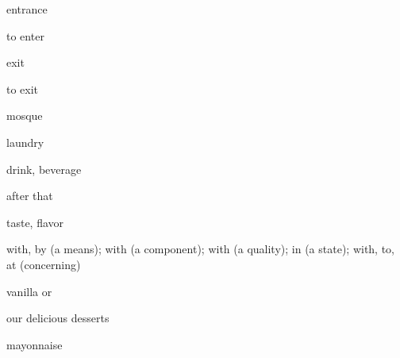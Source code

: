 \documentclass[avery5371,grid,frame]{flashcards}
\begin{document}
\begin{flashcard}{\LARGE entrance}
\LARGE {}
\end{flashcard}
\begin{flashcard}{\LARGE to enter}
\LARGE {}
\end{flashcard}
\begin{flashcard}{\LARGE exit}
\LARGE {}
\end{flashcard}
\begin{flashcard}{\LARGE to exit}
\LARGE {}
\end{flashcard}
\begin{flashcard}{\LARGE mosque}
\LARGE {}
\end{flashcard}
\begin{flashcard}{\LARGE laundry}
\LARGE {}
\end{flashcard}
\begin{flashcard}{\LARGE drink, beverage}
\LARGE {}
\end{flashcard}
\begin{flashcard}{\LARGE after that}
\LARGE {}
\end{flashcard}
\begin{flashcard}{\LARGE taste, flavor}
\LARGE {}
\end{flashcard}
\begin{flashcard}{\LARGE with, by (a means); with (a component); with (a quality); in (a state); with, to, at (concerning)}
\LARGE {}
\end{flashcard}
\begin{flashcard}{\LARGE vanilla}
\LARGE {} or 
\end{flashcard}
\begin{flashcard}{\LARGE our delicious desserts}
\LARGE {}
\end{flashcard}
\begin{flashcard}{\LARGE mayonnaise}
\LARGE {}
\end{flashcard}
\end{document}
